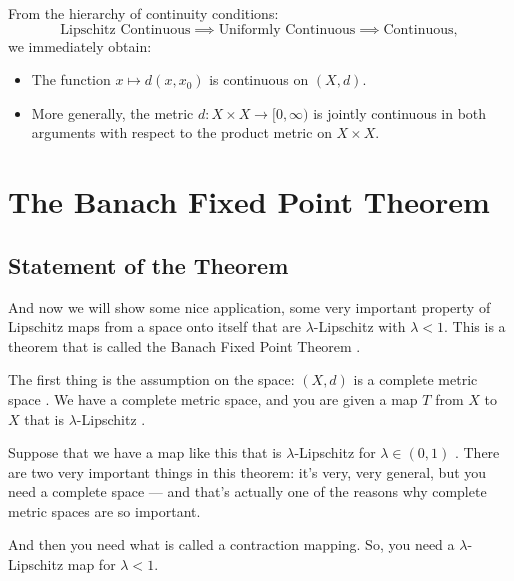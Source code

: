 \begin{content}
\begin{steps}
From the hierarchy of continuity conditions:
\[
\text{Lipschitz Continuous} \implies \text{Uniformly Continuous} \implies \text{Continuous},
\]
we immediately obtain:
\begin{itemize}
    \item The function $x \mapsto d(x, x_0)$ is continuous on $(X, d)$.
    \item More generally, the metric $d \colon X \times X \to [0, \infty)$ is jointly continuous in both arguments with respect to the product metric on $X \times X$.
\end{itemize}
\end{steps}
\end{content}

\begin{hidden}
\end{hidden}

\section{The Banach Fixed Point Theorem}

\subsection{Statement of the Theorem}

\begin{speech}[00:18:22 - 00:20:15]
And now we will show some nice application, some very important property of Lipschitz maps from a space onto itself that are $\lambda$-Lipschitz with $\lambda < 1$. This is a theorem that is called the Banach Fixed Point Theorem .

The first thing is the assumption on the space: $(X, d)$ is a complete metric space . We have a complete metric space, and you are given a map $T$ from $X$ to $X$  that is $\lambda$-Lipschitz .

Suppose that we have a map like this that is $\lambda$-Lipschitz for $\lambda \in (0, 1)$ . There are two very important things in this theorem: it's very, very general, but you need a complete space --- and that's actually one of the reasons why complete metric spaces are so important.

And then you need what is called a contraction mapping. So, you need a $\lambda$-Lipschitz map for $\lambda < 1$.
\end{speech}

